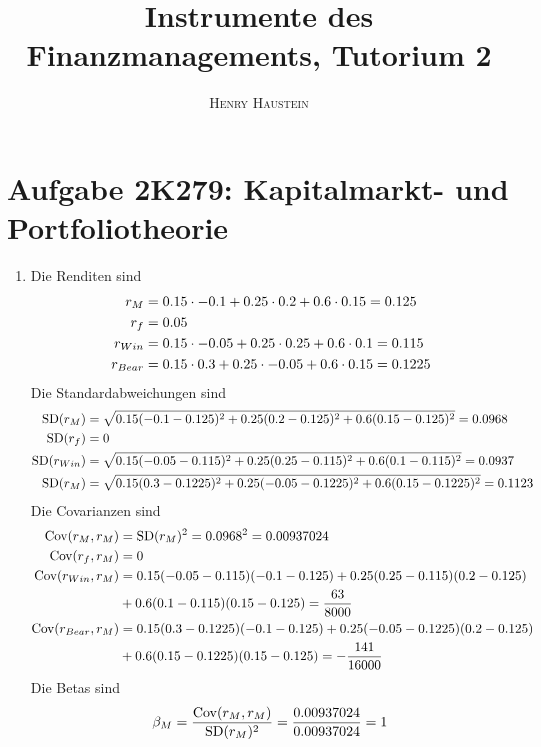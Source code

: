 \documentclass{article}
\title{\textbf{Instrumente des Finanzmanagements, Tutorium 2}}
\author{\textsc{Henry Haustein}}
\date{}
\DeclareMathOperator{\Cov}{Cov}
\DeclareMathOperator{\SD}{SD}
\begin{document}
	\maketitle
	
	\section*{Aufgabe 2K279: Kapitalmarkt- und Portfoliotheorie}
	\begin{enumerate}[label=(\alph*)]
		\item Die Renditen sind
		\begin{align}
			r_M &= 0.15\cdot -0.1 + 0.25\cdot 0.2 + 0.6\cdot 0.15 = 0.125 \notag \\
			r_f &= 0.05 \notag \\
			r_{Win} &= 0.15\cdot -0.05 + 0.25\cdot 0.25 + 0.6\cdot 0.1 = 0.115 \notag \\
			r_{Bear} &= 0.15\cdot 0.3 + 0.25\cdot -0.05 + 0.6\cdot 0.15 = 0.1225 \notag
		\end{align}
		Die Standardabweichungen sind
		\begin{align}
			\SD(r_M) &= \sqrt{0.15(-0.1-0.125)^2 + 0.25(0.2-0.125)^2 + 0.6(0.15-0.125)^2} = 0.0968 \notag \\
			\SD(r_f) &= 0 \notag \\
			\SD(r_{Win}) &= \sqrt{0.15(-0.05-0.115)^2 + 0.25(0.25-0.115)^2 + 0.6(0.1-0.115)^2} = 0.0937 \notag \\
			\SD(r_M) &= \sqrt{0.15(0.3-0.1225)^2 + 0.25(-0.05-0.1225)^2 + 0.6(0.15-0.1225)^2} = 0.1123 \notag
		\end{align}
		Die Covarianzen sind
		\begin{align}
			\Cov(r_M,r_M) &= \SD(r_M)^2 = 0.0968^2 = 0.00937024 \notag \\
			\Cov(r_f,r_M) &= 0 \notag \\
			\Cov(r_{Win},r_M) &= 0.15(-0.05-0.115)(-0.1-0.125) + 0.25(0.25-0.115)(0.2-0.125) \notag \\
			&+ 0.6(0.1-0.115)(0.15-0.125) = \frac{63}{8000} \notag \\
			\Cov(r_{Bear},r_M) &= 0.15(0.3-0.1225)(-0.1-0.125) + 0.25(-0.05-0.1225)(0.2-0.125) \notag \\
			&+ 0.6(0.15-0.1225)(0.15-0.125) = -\frac{141}{16000} \notag
		\end{align}
		Die Betas sind
		\begin{align}
			\beta_M &= \frac{\Cov(r_M,r_M)}{\SD(r_M)^2} = \frac{0.00937024}{0.00937024} = 1 \notag \\

\end{align}
\end{enumerate}
\end{document}

